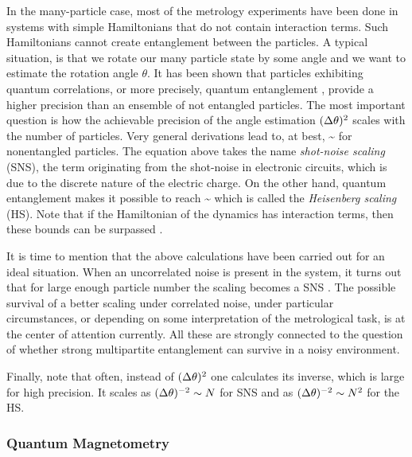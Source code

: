 In the many-particle case, most of the metrology experiments have been done in systems with simple Hamiltonians that do not contain interaction terms.
Such Hamiltonians cannot create entanglement between the particles.
A typical situation, is that we rotate our many particle state by some angle and we want to estimate the rotation angle $\theta$.
It has been shown that particles exhibiting quantum correlations, or more precisely, quantum entanglement \citep{Guehne2009, Luis2004}, provide a higher precision than an ensemble of not entangled particles.
The most important question is how the achievable precision of the angle estimation $(\Delta \theta )^2$ scales with the number of particles.
Very general derivations lead to, at best,
\be
  \label{eq:bg-shot-noise-scaling}
  \varian{\theta}\sim {}
\ee
for nonentangled particles.
The equation above takes the name \emph{shot-noise scaling} (SNS), the term originating from the shot-noise in electronic circuits, which is due to the discrete nature of the electric charge.
On the other hand, quantum entanglement makes it possible to reach
\be
  \label{eq:bg-heisenberg-scaling}
  \varian{\theta}\sim {}
\ee
which is called the \emph{Heisenberg scaling} (HS).
Note that if the Hamiltonian of the dynamics has interaction terms, then these bounds can be surpassed \citep{Luis2004, Napolitano2011, Boixo2007, Braun2011, Roy2008, Choi2008, Rey2007}.

It is time to mention that the above calculations have been carried out for an ideal situation.
When an uncorrelated noise is present in the system, it turns out that for large enough particle number the scaling becomes a SNS \citep{}.
The possible survival of a better scaling under correlated noise, under particular circumstances, or depending on some interpretation of the metrological task, is at the center of attention currently.
All these are strongly connected to the question of whether strong multipartite entanglement can survive in a noisy environment.

Finally, note that often, instead of $(\Delta \theta )^2$ one calculates its inverse, which is large for high precision.
It scales as $(\Delta \theta )^{-2}\sim N$ for SNS and as $(\Delta \theta )^{-2}\sim N^2$ for the HS.

\subsubsection{Quantum Magnetometry}
\label{sec:bg-quantum-magnetometry}

